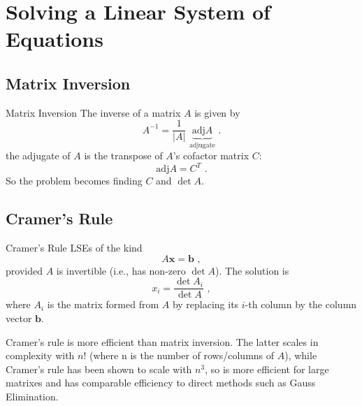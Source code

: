 \documentclass[11pt]{beamer}
\begin{document}
\section{Solving a Linear System of Equations}
\subsection{Matrix Inversion}
\begin{frame}[fragile]{Matrix Inversion}
The inverse of a matrix $A$ is given by
\begin{equation}
A^{-1} = \frac{1}{|A|} \,\, \underbrace{\mathrm{adj}{A}}_\text{adjugate}\,\,.
\end{equation}
the adjugate of $A$ is the transpose of $A$'s cofactor matrix $C$:
\begin{equation}
\mathrm{adj}{A} = C^T\,\,.
\end{equation}
So the problem becomes finding $C$ and $\det A$. 
\end{frame}

\subsection{Cramer's Rule}
\begin{frame}[fragile]{Cramer's Rule}
LSEs of the kind
\begin{equation}
A \mathbf{x} = \mathbf{b}\,\,,
\label{eq:lse2}
\end{equation}
provided $A$ is invertible (i.e., has non-zero $\det A$). The solution
 is
\begin{equation}
x_i = \frac{\det A_i}{\det A}\,\,,
\end{equation}
where $A_i$ is the matrix formed from $A$ by replacing its $i$-th
column by the column vector $\mathbf{b}$.

Cramer's rule is more efficient than matrix inversion. The latter
scales in complexity with $n!$ (where n is the number of rows/columns of $A$),
while Cramer's rule has been shown to scale with $n^3$, so is more efficient
for large matrixes and has comparable efficiency to direct methods
such as Gauss Elimination.
\end{frame}
\end{document}
